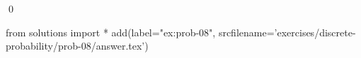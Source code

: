 
\begin{ex} 
  \label{ex:prob-08}
  
  \qed
\end{ex} 
\begin{python0}
from solutions import *
add(label="ex:prob-08",
    srcfilename='exercises/discrete-probability/prob-08/answer.tex') 
\end{python0}
